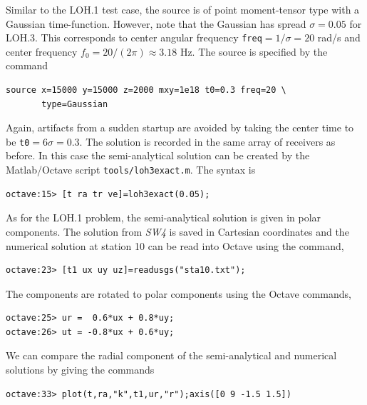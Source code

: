 \documentclass[11pt]{report}
\begin{document}
Similar to the LOH.1 test case, the source is of point moment-tensor type with a Gaussian
time-function. However, note that the Gaussian has spread $\sigma=0.05$ for LOH.3. This corresponds
to center angular frequency {\tt freq}$= 1/\sigma=20$ rad/s and center frequency
$f_0=20/(2\pi)\approx 3.18$ Hz. The source is specified by the command
\begin{verbatim}
source x=15000 y=15000 z=2000 mxy=1e18 t0=0.3 freq=20 \
       type=Gaussian
\end{verbatim}
Again, artifacts from a sudden startup are avoided by taking the center time to be {\tt t0}$=6
\sigma = 0.3$.  The solution is recorded in the same array of receivers as before.
In this case the semi-analytical solution can be created by the Matlab/Octave script
\verb+tools/loh3exact.m+. The syntax is
\begin{verbatim}
octave:15> [t ra tr ve]=loh3exact(0.05);
\end{verbatim}
As for the LOH.1 problem, the semi-analytical solution is given in polar components. The solution
from \emph{SW4} is saved in Cartesian coordinates and the numerical solution at station 10 can be
read into Octave using the command,
\begin{verbatim}
octave:23> [t1 ux uy uz]=readusgs("sta10.txt");
\end{verbatim}
The components are rotated to polar components using the Octave commands,
\begin{verbatim}
octave:25> ur =  0.6*ux + 0.8*uy;
octave:26> ut = -0.8*ux + 0.6*uy;
\end{verbatim}
We can compare the radial component of the semi-analytical and numerical solutions by giving the
commands
\begin{verbatim}
octave:33> plot(t,ra,"k",t1,ur,"r");axis([0 9 -1.5 1.5])
\end{verbatim}
\end{document}
